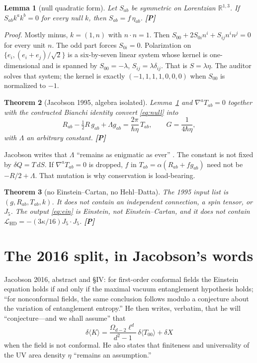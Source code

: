 \documentclass[11pt]{article}
\newtheorem{theorem}{Theorem}[section]
\newtheorem{lemma}[theorem]{Lemma}
\theoremstyle{definition}
\newcommand{\pP}{\textbf{[P]}}
\begin{document}
\begin{lemma}[null quadratic form]
\label{lem:null}
Let $S_{ab}$ be symmetric on Lorentzian $\mathbb{R}^{1,3}$. If
$S_{ab}k^ak^b=0$ for every null $k$, then $S_{ab}=f\,\eta_{ab}$.
\pP{}
\end{lemma}

\emph{Proof.} Mostly minus, $k=(1,n)$ with $n\cdot n=1$. Then
$S_{00}+2S_{0i}n^i+S_{ij}n^in^j=0$ for every unit $n$. The odd
part forces $S_{0i}=0$. Polarization on
$\{e_i,(e_i+e_j)/\sqrt{2}\}$ is a six-by-seven linear system
whose kernel is one-dimensional and is spanned by
$S_{00}=-\lambda$, $S_{ij}=\lambda\delta_{ij}$. That is
$S=\lambda\eta$. The auditor solves that system; the kernel is
exactly $(-1,1,1,1,0,0,0)$ when $S_{00}$ is normalized to $-1$.

\begin{theorem}[Jacobson 1995, algebra isolated]
\label{thm:1995}
Lemma~\ref{lem:null} and $\nabla^a T_{ab}=0$ together with the
contracted Bianchi identity convert \eqref{eq:null} into
\begin{equation}
R_{ab}-\tfrac12 R\,g_{ab}+\Lambda g_{ab}
=
\frac{2\pi}{\hbar\eta}\,T_{ab},
\qquad
G=\frac{1}{4\hbar\eta},
\label{eq:ein}
\end{equation}
with $\Lambda$ an arbitrary constant. \pP{}
\end{theorem}

Jacobson writes that $\Lambda$ ``remains as enigmatic as ever''
\cite{Jacobson1995}. The constant is not fixed by $\delta Q=T\,dS$.
If $\nabla^a T_{ab}=0$ is dropped, $f$ in $T_{ab}=\alpha(R_{ab}+fg_{ab})$
need not be $-R/2+\Lambda$. That mutation is why conservation is
load-bearing.

\begin{theorem}[no Einstein--Cartan, no Hehl--Datta]
\label{thm:nohd}
The 1995 input list is $(g,R_{ab},T_{ab},k)$. It does not contain
an independent connection, a spin tensor, or $J_5$. The output
\eqref{eq:ein} is Einstein, not Einstein--Cartan, and it does not
contain $\mathcal{L}_{\mathrm{HD}}=-(3\kappa/16)J_5\cdot J_5$. \pP{}
\end{theorem}

\section{The 2016 split, in Jacobson's words}

Jacobson 2016, abstract and \S IV: for first-order conformal
fields the Einstein equation holds if and only if the maximal
vacuum entanglement hypothesis holds; ``for nonconformal fields,
the same conclusion follows modulo a conjecture about the
variation of entanglement entropy.'' He then writes, verbatim,
that he will ``conjecture---and we shall assume'' that
\begin{equation}
\delta\langle K\rangle
=
\frac{\Omega_{d-2}\ell^d}{d^2-1}\,\delta\langle T_{00}\rangle+\delta X
\label{eq:conj}
\end{equation}
when the field is not conformal. He also states that finiteness
and universality of the UV area density $\eta$ ``remains an
assumption.''
\end{document}
